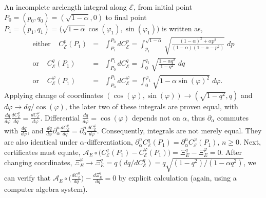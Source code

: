 \documentclass[nofootinbib,preprint]{revtex4-1}
\begin{document}
An incomplete arclength integral along $\mathcal{E}$, from initial point 
$P_0 = (p_0,q_0) = (\sqrt{1-\alpha},0)$ to final point 
$P_1 = (p_1,q_1) = \big(\sqrt{1-\alpha}\cos(\varphi_1),\sin(\varphi_1)\big)$ 
is written as,
\begin{eqnarray}
 \text{either} \;\;\;\;  
 C^{p}_{\mathcal{E}}(P_1) &=& \int_{P_1}^{P_0} dC^{p}_{\mathcal{E}} 
 =\int^{\sqrt{1-\alpha}}_{p_1} \sqrt{\frac{(1-\alpha)^2 +\alpha p^2}{(1-\alpha)(1-\alpha-p^2)}} \;dp   \nonumber \\ 
 \text{or} \;\;\;\;  
 C^{q}_{\mathcal{E}}(P_1) &=& \int_{P_0}^{P_1} dC^{q}_{\mathcal{E}} 
 =\int_{0}^{q_1} \sqrt{\frac{1-\alpha q^2}{1-q^2}} \;dq   \nonumber \\
 \text{or} \;\;\;\;  
 C^{\varphi}_{\mathcal{E}}(P_1) &=& \int_{P_0}^{P_1} dC^{\varphi}_{\mathcal{E}} 
 =\int_{0}^{\varphi_1} \sqrt{1-\alpha \sin(\varphi)^2} \;d\varphi .   \nonumber 
\end{eqnarray}
Applying change of coordinates $(\cos(\varphi),\sin(\varphi))\rightarrow (\sqrt{1-q^2},q)$ and  
$d\varphi \rightarrow dq/\cos(\varphi)$, the later two of these integrals are proven 
equal, with ${\frac{dq}{d\varphi}\frac{dC^{q}_{\mathcal{E}}}{dq}
=\frac{dC^{\varphi}_{\mathcal{E}}}{d\varphi}}$. Differential $\frac{dq}{d\varphi} = \cos(\varphi)$ 
depends not on $\alpha$, thus $\partial_{\alpha}$ commutes with  $\frac{dq}{d\varphi}$, and  
${\frac{dq}{d\varphi}\partial_{\alpha}^n \frac{dC^{q}_{\mathcal{E}}}{dq}
=\partial_{\alpha}^n\frac{dC^{\varphi}_{\mathcal{E}}}{d\varphi}}$.
Consequently, integrals are not merely equal. They are also identical under 
$\alpha$-differentiation, 
${\partial_{\alpha}^nC^{q}_{\mathcal{E}}(P_1)=\partial_{\alpha}^nC^{\varphi}_{\mathcal{E}}(P_1)}$, 
${n \ge 0}$. Next, certificates must equate, 
${\mathcal{A}_E \circ \big(C^{q}_{\mathcal{E}}(P_1)-C^{\varphi}_{\mathcal{E}}(P_1)\big)
=\Xi^{q}_{E}-\Xi^{\varphi}_{E}=0}$. After changing coordinates, 
$\Xi_E^{\varphi} \rightarrow \Xi_E^{q} = q(dq/dC^{q}_{\mathcal{E}})= q\sqrt{(1-q^2)/(1-\alpha q^2)}$,
we can verify that $\mathcal{A}_E \circ \big(\frac{dC^{q}_{\mathcal{E}}}{dq}\big) - \frac{d\Xi_E^{q}}{dq} = 0$ 
by explicit calculation (again, using a computer algebra system).
 
\end{document}

